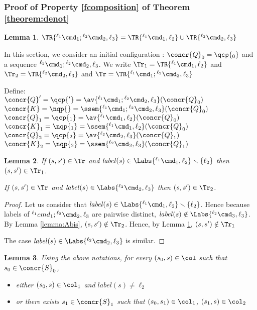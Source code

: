 \documentclass[12pt]{article}
\let\firstunion\cup
\let\cup\firstunion
\newcommand{\li}[1]{ {}^{\ell_{#1}}  }
\newcounter{labels}[figure]
\newcommand{\lbl}{\mathit{label}}
\newtheorem{lemma}{Lemma}
\begin{document}
\subsubsection{Proof of Property \ref{fcomposition} of Theorem \ref{theorem:denot}} 

\begin{lemma}
 \label{lemma:G}
 \(\TR{\li1\cmd_1;\li2\cmd_2,\ell_3}=\TR{\li1\cmd_1,\ell_2}\cup\TR{\li2\cmd_2,\ell_3}\)
\end{lemma}

In this section, we consider an initial configuration : \(\concr{Q}_0 =\qcp{_0}\) and a sequence \(\li1\cmd_1;\li2\cmd_2,\ell_3\).
We write \(\Tr_1=\TR{\li1\cmd_1,\ell_2}\) and \(\Tr_2=\TR{\li2\cmd_2,\ell_3}\) and \(\Tr=\TR{\li1\cmd_1;\li2\cmd_2,\ell_3}\)

Define:\\
 \(\concr{Q}' =\qcp{'}=\av{\li1\cmd_1;\li2\cmd_2,\ell_3}(\concr{Q}_0)\)\\ \(\concr{K} =\nqp{}=\ssem{\li1\cmd_1;\li2\cmd_2,\ell_3}(\concr{Q}_0)\)\\
 \(\concr{Q}_1 =\qcp{_1}=\av{\li1\cmd_1,\ell_2}(\concr{Q}_0)\)\\ \(\concr{K}_1 =\nqp{_1}=\ssem{\li1\cmd_1,\ell_2}(\concr{Q}_0)\)\\
 \(\concr{Q}_2 =\qcp{_2}=\av{\li2\cmd_2,\ell_3}(\concr{Q}_1)\)\\
 \(\concr{K}_2 =\nqp{_2}=\ssem{\li2\cmd_2,\ell_3}(\concr{Q}_1)\)


\begin{lemma}
 \label{lemma:G+}
 If \((s,s')\in\Tr\) and \(\lbl(s)\in \Labs{\li1\cmd_1,\ell_2}\smallsetminus\{\ell_2\}\) then \((s,s')\in\Tr_1\).
 
 If \((s,s')\in\Tr\) and \(\lbl(s)\in \Labs{\li2\cmd_2,\ell_3}\) then \((s,s')\in\Tr_2\).
\end{lemma}
\begin{proof}
Let us consider that \(\lbl(s)\in \Labs{\li1\cmd_1,\ell_2}\smallsetminus\{\ell_2\}\). Hence because labels of \(\li1cmd_1;\li2\cmd_2,\ell_3\) are pairwise distinct, \(\lbl(s)\notin\Labs{\li2\cmd_3,\ell_3}\).
 By Lemma \ref{lemma:Abis}, \((s,s')\notin\Tr_2\). Hence, by Lemma \ref{lemma:G}, \((s,s')\notin\Tr_1\)
 
 The case \(\lbl(s)\in \Labs{\li2\cmd_2,\ell_3}\) is similar. 
\end{proof}


\begin{lemma}\label{lemma:Cbis}
Using the above notations, for every \((s_0,s)\in\col\) such that \(s_0\in\concr{S}_0\),
\begin{itemize}
  \item either \((s_0,s)\in\col_1\) and \(\lbl(s)\neq\ell_2\)
  \item or there exists \(s_1\in\concr{S}_1\) such that \((s_0,s_1)\in\col_1\), \((s_1,s)\in\col_2\)
 \end{itemize}
 \end{lemma}
 
\end{document}
